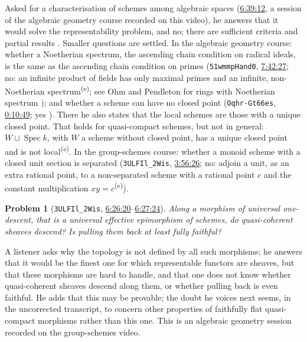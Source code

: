 \documentclass[11pt,a4paper]{amsart}
\newtheorem{problem}{Problem}
\theoremstyle{definition}
\theoremstyle{remark}
\newcommand{\ts}[3]{\href{https://www.youtube.com/watch?v=#1&t=#2}{#3}}
\newcommand{\own}{\textsuperscript{(e)}}
\begin{document}
Asked for a characterisation of schemes among algebraic spaces (\ts{3ULFIl_2Wis}{6h39m12s}{6:39:12}, a session of the algebraic geometry course recorded on this video), he answers that it would solve the representability problem, and no; there are sufficient criteria and partial results \cite[03XX, 0ADD, 03JI, 0D2W]{stacks}. Smaller questions are settled. In the algebraic geometry course: whether a Noetherian spectrum, the ascending chain condition on radical ideals, is the same as the ascending chain condition on primes (\texttt{51wmmpHand0}, \ts{51wmmpHand0}{7h42m27s}{7:42:27}; no: an infinite product of fields has only maximal primes and an infinite, non-Noetherian spectrum\own; see Ohm and Pendleton for rings with Noetherian spectrum \cite{ohm}); and whether a scheme can have no closed point (\texttt{Oqhr-Gt66es}, \ts{Oqhr-Gt66es}{0h10m49s}{0:10:49}; yes \cite[01IY]{stacks}). There he also states that the local schemes are those with a unique closed point. That holds for quasi-compact schemes, but not in general: $W\sqcup\operatorname{Spec}k$, with $W$ a scheme without closed point, has a unique closed point and is not local\own. In the group-schemes course: whether a monoid scheme with a closed unit section is separated (\texttt{3ULFIl\_2Wis}, \ts{3ULFIl_2Wis}{3h56m26s}{3:56:26}; no: adjoin a unit, as an extra rational point, to a non-separated scheme with a rational point $c$ and the constant multiplication $xy=c$\own). 

\begin{problem}[\texttt{3ULFIl\_2Wis}, \ts{3ULFIl_2Wis}{6h26m20s}{6:26:20}--\ts{3ULFIl_2Wis}{6h27m24s}{6:27:24}]\label{p:qcoh}
Along a morphism of universal one-descent, that is a universal effective epimorphism of schemes, do quasi-coherent sheaves descend? Is pulling them back at least fully faithful?
\end{problem}
A listener asks why the topology is not defined by all such morphisms; he answers that it would be the finest one for which representable functors are sheaves, but that these morphisms are hard to handle, and that one does not know whether quasi-coherent sheaves descend along them, or whether pulling back is even faithful. He adds that this may be provable; the doubt he voices next seems, in the uncorrected transcript, to concern other properties of faithfully flat quasi-compact morphisms rather than this one. This is an algebraic geometry session recorded on the group-schemes video.
\end{document}
